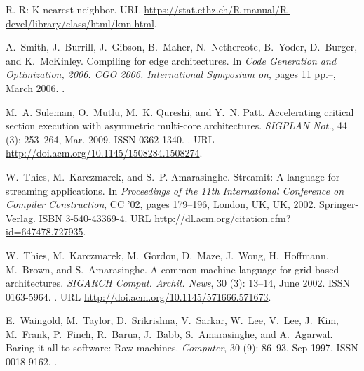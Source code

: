 \documentclass{sigplanconf}
\begin{document}
\begin{thebibliography}{}
R.
\newblock R: K-nearest neighbor.
\newblock URL
  \url{https://stat.ethz.ch/R-manual/R-devel/library/class/html/knn.html}.

A.~Smith, J.~Burrill, J.~Gibson, B.~Maher, N.~Nethercote, B.~Yoder, D.~Burger,
  and K.~McKinley.
\newblock Compiling for edge architectures.
\newblock In \emph{Code Generation and Optimization, 2006. CGO 2006.
  International Symposium on}, pages 11 pp.--, March 2006.
\newblock {}.

M.~A. Suleman, O.~Mutlu, M.~K. Qureshi, and Y.~N. Patt.
\newblock Accelerating critical section execution with asymmetric multi-core
  architectures.
\newblock \emph{SIGPLAN Not.}, 44 (3): 253--264, Mar. 2009.
\newblock ISSN 0362-1340.
\newblock {}.
\newblock URL \url{http://doi.acm.org/10.1145/1508284.1508274}.

W.~Thies, M.~Karczmarek, and S.~P. Amarasinghe.
\newblock Streamit: A language for streaming applications.
\newblock In \emph{Proceedings of the 11th International Conference on Compiler
  Construction}, CC '02, pages 179--196, London, UK, UK, 2002{}.
  Springer-Verlag.
\newblock ISBN 3-540-43369-4.
\newblock URL \url{http://dl.acm.org/citation.cfm?id=647478.727935}.

W.~Thies, M.~Karczmarek, M.~Gordon, D.~Maze, J.~Wong, H.~Hoffmann, M.~Brown,
  and S.~Amarasinghe.
\newblock A common machine language for grid-based architectures.
\newblock \emph{SIGARCH Comput. Archit. News}, 30 (3):
  13--14, June 2002{}.
\newblock ISSN 0163-5964.
\newblock {}.
\newblock URL \url{http://doi.acm.org/10.1145/571666.571673}.

E.~Waingold, M.~Taylor, D.~Srikrishna, V.~Sarkar, W.~Lee, V.~Lee, J.~Kim,
  M.~Frank, P.~Finch, R.~Barua, J.~Babb, S.~Amarasinghe, and A.~Agarwal.
\newblock Baring it all to software: Raw machines.
\newblock \emph{Computer}, 30 (9): 86--93, Sep 1997.
\newblock ISSN 0018-9162.
\newblock {}.


\end{thebibliography}
\end{document}
